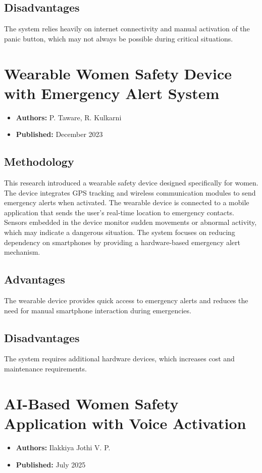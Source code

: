 \documentclass[a4paper,12pt]{report}
\begin{document}
\subsection{Disadvantages}
\par The system relies heavily on internet connectivity and manual activation of the panic button, which may not always be possible during critical situations.

\section{Wearable Women Safety Device with Emergency Alert System}
\begin{itemize}
    \item \textbf{Authors:} P. Taware, R. Kulkarni
    \item \textbf{Published:} December 2023
\end{itemize}

\subsection{Methodology}
\par This research introduced a wearable safety device designed specifically for women. The device integrates GPS tracking and wireless communication modules to send emergency alerts when activated. The wearable device is connected to a mobile application that sends the user’s real-time location to emergency contacts. Sensors embedded in the device monitor sudden movements or abnormal activity, which may indicate a dangerous situation. The system focuses on reducing dependency on smartphones by providing a hardware-based emergency alert mechanism.

\subsection{Advantages}
\par The wearable device provides quick access to emergency alerts and reduces the need for manual smartphone interaction during emergencies.

\subsection{Disadvantages}
\par The system requires additional hardware devices, which increases cost and maintenance requirements.

\section{AI-Based Women Safety Application with Voice Activation}
\begin{itemize}
    \item \textbf{Authors:} Ilakkiya Jothi V. P.
    \item \textbf{Published:} July 2025
\end{itemize}
\end{document}
